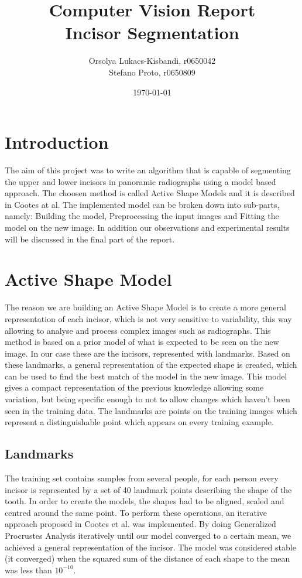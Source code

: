 \documentclass[a4paper]{article}
\author{Orsolya Lukacs-Kisbandi, r0650042 \\
		Stefano Proto, r0650809}
\title{ \textbf{Computer Vision Report \\ 
		Incisor Segmentation} }
\date{\today}
\begin{document}
\maketitle
\newpage
\setcounter{page}{1}
\tableofcontents


\section{Introduction}

The aim of this project was to write  an  algorithm  that  is  capable  of  segmenting  the upper and lower incisors in panoramic radiographs  using  a  model  based  approach. The choosen method is called Active Shape Models and it is described in \cite{cootes1} Cootes at al. The implemented model can be broken down into sub-parts, namely: Building the model, Preprocessing the input images and Fitting the model on the new image. In addition our observations and experimental results will be discussed in the final part of the report. 

\section{Active Shape Model}

The reason we are building an Active Shape Model is to create a more general representation of each incisor, which is not very sensitive to variability, this way allowing to analyse and process complex images such as radiographs. This method is based on a prior model of what is expected to be seen on the new image. In our case these are the incisors, represented with landmarks. Based on these landmarks, a general representation of the expected shape is created, which can be used to find the best match of the model in the new image. This model gives a compact representation of the previous knowledge allowing some variation, but being specific enough to not to allow changes which haven't been seen in the training data. The landmarks are points on the training images which represent a distinguishable point which appears on every training example.

\subsection{Landmarks} %
The training set contains samples from several people, for each person every incisor is represented by a set of 40 landmark points describing the shape of the tooth. In order to create the models, the shapes had to be aligned, scaled and centred around the same point. To perform these operations, an iterative approach proposed in \cite{cootes1} Cootes et al. was implemented. By doing Generalized Procrustes Analysis iteratively until our model converged to a certain mean, we achieved a general representation of the incisor. The model was considered stable (it converged) when the squared sum of the distance of each shape to the mean was less than $10^{-10}$.
\end{document}

